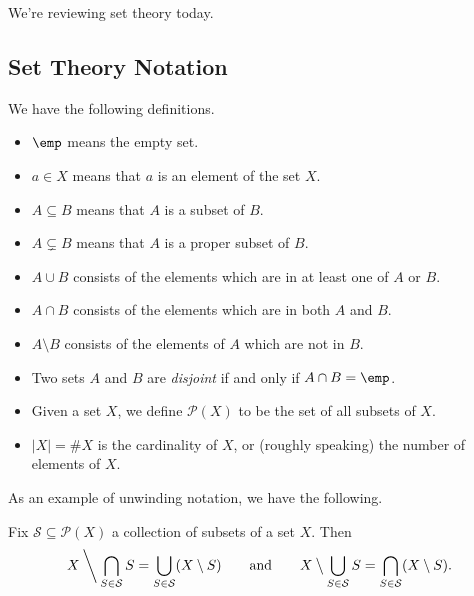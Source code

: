 
We're reviewing set theory today.

\subsection{Set Theory Notation}
We have the following definitions.
\begin{itemize}
	\item $\emp$ means the empty set.
	\item $a\in X$ means that $a$ is an element of the set $X$.
	\item $A\subseteq B$ means that $A$ is a subset of $B$.
	\item $A\subsetneq B$ means that $A$ is a proper subset of $B$.
	\item $A\cup B$ consists of the elements which are in at least one of $A$ or $B$.
	\item $A\cap B$ consists of the elements which are in both $A$ and $B$.
	\item $A\setminus B$ consists of the elements of $A$ which are not in $B$.
	\item Two sets $A$ and $B$ are \textit{disjoint} if and only if $A\cap B=\emp$.
	\item Given a set $X$, we define $\mathcal P(X)$ to be the set of all subsets of $X$.
	\item $|X|=\#X$ is the cardinality of $X$, or (roughly speaking) the number of elements of $X$.
\end{itemize}
As an example of unwinding notation, we have the following.
\begin{proposition}
	Fix $\mathcal S\subseteq\mathcal P(X)$ a collection of subsets of a set $X$. Then
	\[X\mathbin{\bigg\backslash} \bigcap_{S\in\mathcal S}S=\bigcup_{S\in\mathcal S}(X\setminus S)\qquad\text{and}\qquad X\mathbin{\big\backslash}\bigcup_{S\in\mathcal S}S=\bigcap_{S\in\mathcal S}(X\setminus S).\]
\end{proposition}
